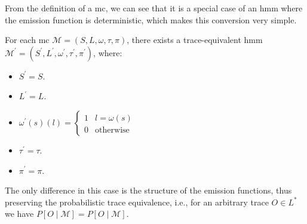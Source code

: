 From the definition of a \gls{mc}, we can see that it is a special case of an \gls{hmm} where the emission function is deterministic, which makes this conversion very simple.


\begin{definition}
    For each \gls{mc} $\mathcal{M} = (S, L, \omega, \tau, \pi)$, there exists a trace-equivalent \gls{hmm} $\mathcal{M}^{\prime} = (S^{\prime}, L^{\prime}, \omega^{\prime}, \tau^{\prime}, \pi^{\prime})$, where:
    \begin{itemize}
        \item $S^{\prime} = S$.
        \item $L^{\prime} = L$.
        \item $\omega^{\prime}(s)(l) = \begin{cases}
                      1 & l=\omega(s)      \\
                      0 & \text{otherwise}
                  \end{cases}$
        \item $\tau^{\prime} = \tau$.
        \item $\pi^{\prime} = \pi$.
    \end{itemize}
\end{definition}


The only difference in this case is the structure of the emission functions, thus preserving the probabilistic trace equivalence, i.e., for an arbitrary trace $O \in L^*$ we have $P[O \mid \mathcal{M}] = P[O \mid \mathcal{M}]$.

